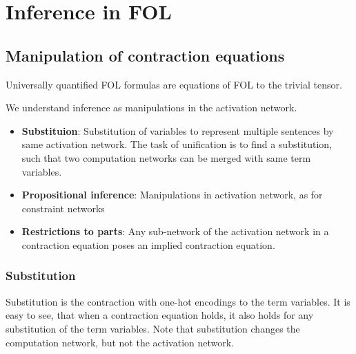 \section{Inference in FOL}




\subsection{Manipulation of contraction equations}

Universally quantified FOL formulas are equations of FOL \ComputationActivationNetworks{} to the trivial tensor.


We understand inference as manipulations in the activation network.
\begin{itemize}
    \item {\bf Substituion}: Substitution of variables to represent multiple sentences by same activation network.
    The task of unification is to find a substitution, such that two computation networks can be merged with same term variables.
    \item {\bf Propositional inference}: Manipulations in activation network, as for constraint networks
    \item {\bf Restrictions to parts}: Any sub-network of the activation network in a contraction equation poses an implied contraction equation.
\end{itemize}

\subsubsection{Substitution}

Substitution is the contraction with one-hot encodings to the term variables.
It is easy to see, that when a contraction equation holds, it also holds for any substitution of the term variables.
Note that substitution changes the computation network, but not the activation network.

